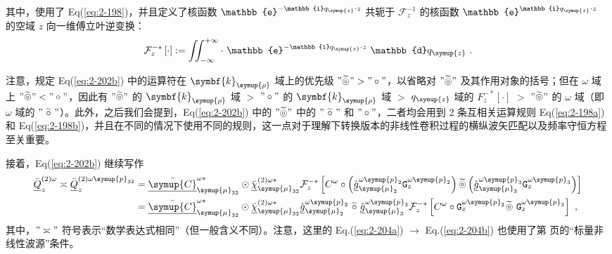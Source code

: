 其中，使用了 Eq(\ref{eq:2-198})，并且定义了核函数 ${\mathbb{e}^{-\mathbb{i} q_{\symup{z}} \cdot z}}$ 共轭于 $\mathcal F^{-1}_{z}$ 的核函数 ${\mathbb{e}^{\mathbb{i} q_{\symup{z}} \cdot z}}$ 的空域 $z$ 向一维傅立叶逆变换：
\begin{equation} \label{eq:2-203}
	\abovedisplayskip=13pt
	\belowdisplayskip=13pt
	\mathcal F^{-*}_{z} \left[ \cdot \right] := \iint_{-\infty}^{+\infty} \cdot\  {\mathbb{e}^{-\mathbb{i} q_{\symup{z}} \cdot z}} ~ {\mathbb{d}{q_{\symup{z}}}} ~.
\end{equation}

注意，规定 Eq(\ref{eq:2-202b}) 中的运算符在 $\symbf{k}_{\symup{\rho}}$ 域上的优先级 $"\widetilde \circledcirc" > "\circ"$，以省略对 $"\widetilde \circledcirc"$ 及其作用对象的括号；但在 $\omega$ 域上 $"\widetilde \circledcirc" < "\circ"$，因此有 $"\widetilde \circledcirc"$ 的 $\symbf{k}_{\symup{\rho}}$ 域 $>$ $"\circ"$ 的 $\symbf{k}_{\symup{\rho}}$ 域 $>$ $q_{\symup{z}}$ 域的 $F^{-*}_{z} \left[ \cdot \right]$ $>$ $"\widetilde \circledcirc"$ 的 $\omega$ 域（即 $\omega$ 域的 $"\ \widetilde \circ\ "$）。此外，之后我们会提到，Eq(\ref{eq:2-202b}) 中的 $"\widetilde \circledcirc"$ 中的 $"\ \widetilde \circ\ "$ 和 $"\circ"$，二者均会用到 2 条互相关运算规则 Eq(\ref{eq:2-198a}) 和 Eq(\ref{eq:2-198b})，并且在不同的情况下使用不同的规则，这一点对于理解下转换版本的非线性卷积过程的横纵波矢匹配以及频率守恒方程至关重要。

接着，Eq(\ref{eq:2-202b}) 继续写作
\begin{subequations} \label{eq:2-204}
	\abovedisplayskip=13pt
	\belowdisplayskip=13pt
	\begin{align}
		\bar{\underline{Q}}^{(2)\omega}_{z} \asymp \bar{\underline{Q}}^{(2)\omega{\symup{p}}_{32}}_{z} &= \bar{\underline{\symup{C}}}^{\omega*}_{{\symup{\mu}}_{32}} \odot \bar{\underline{\chi}}^{(2)\omega*}_{{\symup{\mu}}_{32}} \mathcal F^{-*}_{z} \left[ C^{\omega} \circ \left( \hat{\underline{g}}^{\omega{\symup{p}}_{2}}_{{\symup{\mu}}_2} {\mathtt{G}}^{\omega{\symup{p}}_{2}}_{z} \right) \widetilde \circledcirc \left( \hat{\underline{g}}^{\omega{\symup{p}}_{3}}_{{\symup{\mu}}_3} {\mathtt{G}}^{\omega{\symup{p}}_{3}}_{z} \right) \right] \label{eq:2-204a} \\ &= \bar{\underline{\symup{C}}}^{\omega*}_{{\symup{\mu}}_{32}} \odot \bar{\underline{\chi}}^{(2)\omega*}_{{\symup{\mu}}_{32}} \hat{\underline{g}}^{\omega{\symup{p}}_{2}}_{{\symup{\mu}}_2}\ \widetilde \circ\ \hat{\underline{g}}^{\omega{\symup{p}}_{3}}_{{\symup{\mu}}_3} \mathcal F^{-*}_{z} \left[ C^{\omega} \circ {\mathtt{G}}^{\omega{\symup{p}}_{2}}_{z} \widetilde \circledcirc\ {\mathtt{G}}^{\omega{\symup{p}}_{3}}_{z} \right] \label{eq:2-204b}~,
	\end{align}
\end{subequations}
其中，$"\asymp"$ 符号表示“数学表达式相同”（但一般含义不同）。注意，这里的 Eq.(\ref{eq:2-204a}) $\to$ Eq.(\ref{eq:2-204b}) 也使用了第 \pageref{con:3} 页的“标量非线性波源”条件。

